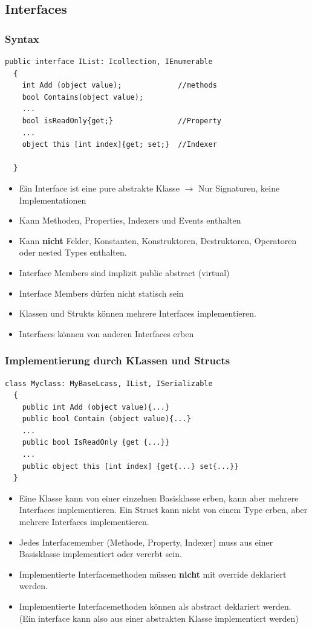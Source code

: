 \subsection{Interfaces}
\subsubsection{Syntax}
\begin{lstlisting}[style=Csharp]
  public interface IList: Icollection, IEnumerable
  {
    int Add (object value);             //methods
    bool Contains(object value);        
    ...
    bool isReadOnly{get;}               //Property
    ...
    object this [int index]{get; set;}  //Indexer
    
  }
\end{lstlisting}
\begin{itemize}
  \item Ein Interface ist eine pure abstrakte Klasse $\rightarrow$ Nur
  Signaturen, keine Implementationen
  \item Kann Methoden, Properties, Indexers und Events enthalten
  \item Kann \textbf{nicht} Felder, Konstanten, Konstruktoren, Destruktoren,
  Operatoren oder nested Types enthalten. 
  \item Interface Members sind implizit public abstract (virtual)
  \item Interface Members dürfen nicht statisch sein
  \item Klassen und Strukts können mehrere Interfaces implementieren. 
  \item Interfaces können von anderen Interfaces erben
\end{itemize}

\subsubsection{Implementierung durch KLassen und Structs}
\begin{lstlisting}[style=Csharp]
  class Myclass: MyBaseLcass, IList, ISerializable
  {
    public int Add (object value){...}
    public bool Contain (object value){...}
    ...
    public bool IsReadOnly {get {...}}
    ...
    public object this [int index] {get{...} set{...}}
  }
\end{lstlisting}
\begin{itemize}
\item Eine Klasse kann von einer einzelnen Basisklasse erben, kann aber mehrere
Interfaces implementieren. Ein Struct kann nicht von einem Type erben, aber
mehrere Interfaces implementieren. 
\item Jedes Interfacemember (Methode, Property, Indexer) muss aus einer
Basisklasse implementiert oder vererbt sein. 
\item Implementierte Interfacemethoden müssen \textbf{nicht} mit override
deklariert werden. 
\item Implementierte Interfacemethoden können als abstract deklariert werden.
(Ein interface kann also aus einer abstrakten Klasse implementiert werden)
\end{itemize}

